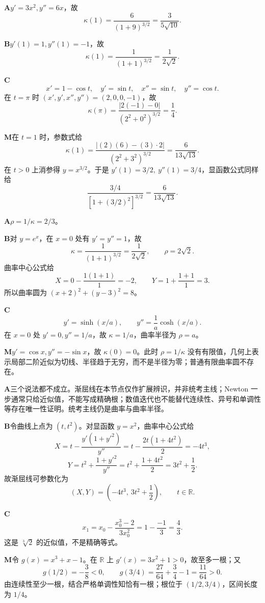 \begin{solutionBox}
\textbf{A}\quad \(y'=3x^2,y''=6x\)，故
\[
\kappa(1)=\frac6{(1+9)^{3/2}}=\frac3{5\sqrt{10}}.
\]

\textbf{B}\quad \(y'(1)=1,y''(1)=-1\)，故
\[
\kappa(1)=\frac1{(1+1)^{3/2}}=\frac1{2\sqrt2}.
\]

\textbf{C}\quad
\[
x'=1-\cos t,\quad y'=\sin t,\quad x''=\sin t,\quad y''=\cos t.
\]
在 \(t=\pi\) 时 \((x',y',x'',y'')=(2,0,0,-1)\)，故
\[
\kappa(\pi)=\frac{|2(-1)-0|}{(2^2+0^2)^{3/2}}=\frac14.
\]

\textbf{M}\quad 在 \(t=1\) 时，参数式给
\[
\kappa(1)=\frac{|(2)(6)-(3)\cdot2|}
{(2^2+3^2)^{3/2}}
=\frac6{13\sqrt{13}}.
\]
在 \(t>0\) 上消参得 \(y=x^{3/2}\)。于是 \(y'(1)=3/2,\ y''(1)=3/4\)，显函数公式同样给
\[
\frac{3/4}{[1+(3/2)^2]^{3/2}}=\frac6{13\sqrt{13}}.
\]
\end{solutionBox}

\begin{solutionBox}
\textbf{A}\quad \(\rho=1/\kappa=2/3\)。

\textbf{B}\quad 对 \(y=e^x\)，在 \(x=0\) 处有 \(y'=y''=1\)，故
\[
\kappa=\frac1{(1+1)^{3/2}}=\frac1{2\sqrt2},
\qquad \rho=2\sqrt2.
\]
曲率中心公式给
\[
X=0-\frac{1(1+1)}1=-2,\qquad
Y=1+\frac{1+1}{1}=3.
\]
所以曲率圆为 \((x+2)^2+(y-3)^2=8\)。

\textbf{C}\quad
\[
y'=\sinh(x/a),\qquad y''=\frac1a\cosh(x/a).
\]
在 \(x=0\) 处 \(y'=0,y''=1/a\)，故 \(\kappa=1/a\)，曲率半径为 \(\rho=a\)。

\textbf{M}\quad \(y'=\cos x,y''=-\sin x\)，故 \(\kappa(0)=0\)。此时 \(\rho=1/\kappa\) 没有有限值，几何上表示局部二阶近似为切线、半径趋于无穷，而不是半径为零；普通有限曲率圆不存在。
\end{solutionBox}

\begin{solutionBox}
\textbf{A}\quad 三个说法都不成立。渐屈线在本节点仅作扩展辨识，并非统考主线；Newton 一步通常只给近似值，不能写成精确根；数值迭代也不能替代连续性、异号和单调性等存在唯一性证明。统考主线仍是曲率与曲率半径。

\textbf{B}\quad 令曲线上点为 \((t,t^2)\)。对显函数 \(y=x^2\)，曲率中心公式给
\[
X=t-\frac{y'(1+y'^2)}{y''}
=t-\frac{2t(1+4t^2)}2=-4t^3,
\]
\[
Y=t^2+\frac{1+y'^2}{y''}
=t^2+\frac{1+4t^2}{2}=3t^2+\frac12.
\]
故渐屈线可参数化为
\[
(X,Y)=\left(-4t^3,\ 3t^2+\frac12\right),\qquad t\in\mathbb R.
\]

\textbf{C}\quad
\[
x_1=x_0-\frac{x_0^3-2}{3x_0^2}
=1-\frac{-1}{3}
=\frac43.
\]
这是 \(\sqrt[3]{2}\) 的近似值，不是精确等式。

\textbf{M}\quad 令 \(g(x)=x^3+x-1\)。在 \(\mathbb R\) 上 \(g'(x)=3x^2+1>0\)，故至多一根；又
\[
g(1/2)=-\frac38<0,\qquad
g(3/4)=\frac{27}{64}+\frac34-1=\frac{11}{64}>0.
\]
由连续性至少一根，结合严格单调性知恰有一根；根位于 \((1/2,3/4)\)，区间长度为 \(1/4\)。
\end{solutionBox}
